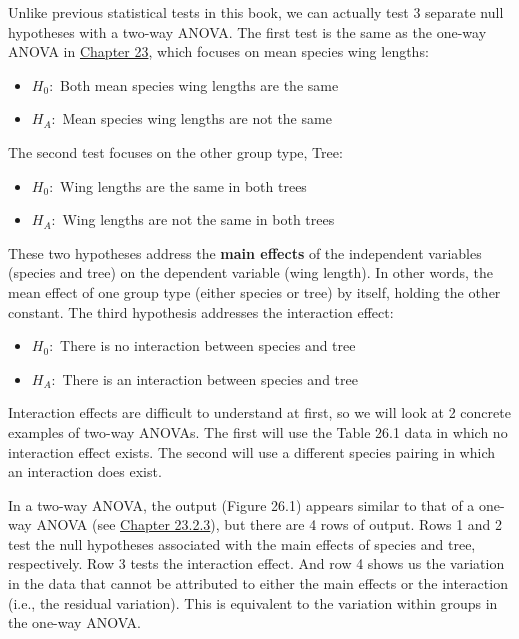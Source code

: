 \documentclass[
]{scrbook}
\providecommand{\tightlist}{%
  \setlength{\itemsep}{0pt}\setlength{\parskip}{0pt}}
\begin{document}
Unlike previous statistical tests in this book, we can actually test 3 separate null hypotheses with a two-way ANOVA.
The first test is the same as the one-way ANOVA in \protect\hyperlink{Chapter_23}{Chapter 23}, which focuses on mean species wing lengths:

\begin{itemize}
\tightlist
\item
  \(H_{0}:\) Both mean species wing lengths are the same
\item
  \(H_{A}:\) Mean species wing lengths are not the same
\end{itemize}

The second test focuses on the other group type, Tree:

\begin{itemize}
\tightlist
\item
  \(H_{0}:\) Wing lengths are the same in both trees
\item
  \(H_{A}:\) Wing lengths are not the same in both trees
\end{itemize}

These two hypotheses address the \textbf{main effects} of the independent variables (species and tree) on the dependent variable (wing length).
In other words, the mean effect of one group type (either species or tree) by itself, holding the other constant.
The third hypothesis addresses the interaction effect:

\begin{itemize}
\tightlist
\item
  \(H_{0}:\) There is no interaction between species and tree
\item
  \(H_{A}:\) There is an interaction between species and tree
\end{itemize}

Interaction effects are difficult to understand at first, so we will look at 2 concrete examples of two-way ANOVAs.
The first will use the Table 26.1 data in which no interaction effect exists.
The second will use a different species pairing in which an interaction does exist.

In a two-way ANOVA, the output (Figure 26.1) appears similar to that of a one-way ANOVA (see \protect\hyperlink{anova-f-statistic-calculation}{Chapter 23.2.3}), but there are 4 rows of output.
Rows 1 and 2 test the null hypotheses associated with the main effects of species and tree, respectively.
Row 3 tests the interaction effect.
And row 4 shows us the variation in the data that cannot be attributed to either the main effects or the interaction (i.e., the residual variation).
This is equivalent to the variation within groups in the one-way ANOVA.
\end{document}
